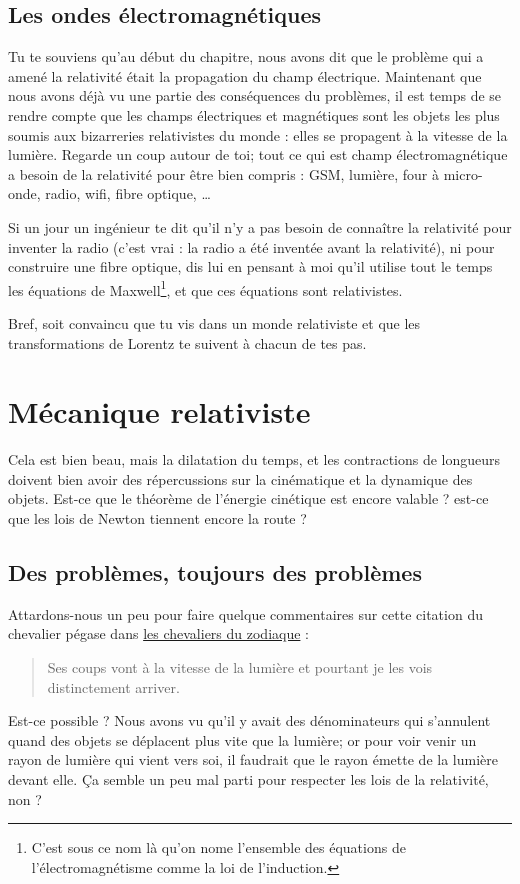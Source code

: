 \subsection{Les ondes électromagnétiques}

Tu te souviens qu'au début du chapitre, nous avons dit que le problème qui a amené la relativité était la propagation du champ électrique. Maintenant que nous avons déjà vu une partie des conséquences du problèmes, il est temps de se rendre compte que les champs électriques et magnétiques sont les objets les plus soumis aux bizarreries relativistes du monde : elles se propagent à la vitesse de la lumière. Regarde un coup autour de toi; tout ce qui est champ électromagnétique a besoin de la relativité pour être bien compris : GSM, lumière, four à micro-onde, radio, wifi, fibre optique, \ldots

Si un jour un ingénieur te dit qu'il n'y a pas besoin de connaître la relativité pour inventer la radio (c'est vrai : la radio a été inventée avant la relativité), ni pour construire une fibre optique, dis lui en pensant à moi qu'il utilise tout le temps les équations de Maxwell\footnote{C'est sous ce nom là qu'on nome l'ensemble des équations de l'électromagnétisme comme la loi de l'induction.}, et que ces équations sont relativistes.

Bref, soit convaincu que tu vis dans un monde relativiste et que les transformations de Lorentz te suivent à chacun de tes pas.

\section{Mécanique relativiste}

Cela est bien beau, mais la dilatation du temps, et les contractions de longueurs doivent bien avoir des répercussions sur la cinématique et la dynamique des objets. Est-ce que le théorème de l'énergie cinétique est encore valable ? est-ce que les lois de Newton tiennent encore la route ?


\subsection{Des problèmes, toujours des problèmes}


Attardons-nous un peu pour faire quelque commentaires sur cette citation du chevalier pégase dans \href{http://fr.wikipedia.org/wiki/Les_Chevaliers_du_Zodiaque}{les chevaliers du zodiaque} : 
\begin{quote}
Ses coups vont à la vitesse de la lumière et pourtant je les vois distinctement arriver.  
\end{quote}
Est-ce possible ? Nous avons vu qu'il y avait des dénominateurs qui s'annulent quand des objets se déplacent plus vite que la lumière; or pour voir venir un rayon de lumière qui vient vers soi, il faudrait que le rayon émette de la lumière devant elle. Ça semble un peu mal parti pour respecter les lois de la relativité, non ?

